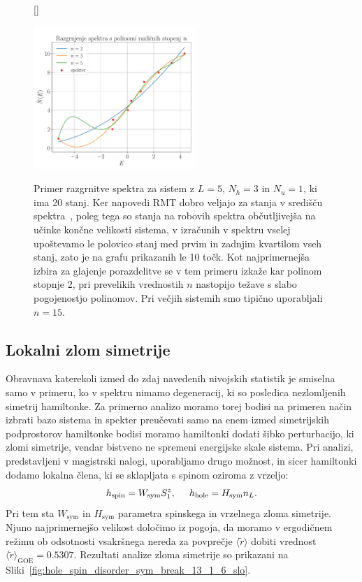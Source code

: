 \begin{figure}[H]
[\FBwidth]
{\caption{Primer razgrnitve spektra za sistem z $L=5$, $N_h=3$ in $N_u=1$, ki ima 20 stanj. Ker napovedi RMT dobro veljajo za stanja v središču spektra~\cite{d2016quantum}, poleg tega so stanja na robovih spektra občutljivejša na učinke končne velikosti sistema, v izračunih v spektru vselej upoštevamo le polovico stanj med prvim in zadnjim kvartilom vseh stanj, zato je na grafu prikazanih le 10 točk. Kot najprimernejša izbira za glajenje porazdelitve se v tem primeru izkaže kar polinom stopnje 2, pri prevelikih vrednostih $n$ nastopijo težave s slabo pogojenostjo polinomov. Pri večjih sistemih smo tipično uporabljali $n=15.$ }\label{fig:unfolding_schematics}}
{\includegraphics[width=0.55\textwidth]{unfolding_schematics.pdf}}
\end{figure}\newpage
\subsection{Lokalni zlom simetrije}
\label{lokalni_zlom_simetrije}
Obravnava katerekoli izmed do zdaj navedenih nivojskih statistik je smiselna samo v primeru, ko v spektru nimamo degeneracij, ki so posledica nezlomljenih simetrij hamiltonke. Za primerno analizo moramo torej bodisi na primeren način izbrati bazo sistema in spekter preučevati samo na enem izmed simetrijskih podprostorov hamiltonke bodisi moramo hamiltonki dodati šibko perturbacijo, ki zlomi simetrije, vendar bistveno ne spremeni energijske skale sistema. Pri analizi, predstavljeni v magistrski nalogi, uporabljamo drugo možnost, in sicer hamiltonki dodamo lokalna člena, ki se sklapljata s spinom oziroma z vrzeljo:
\begin{equation}\label{eq:sym_break_terms}
h_\mathrm{spin}=W_\mathrm{sym}S_1^z, \hspace{5mm} h_\mathrm{hole}=H_\mathrm{sym}n_L.
\end{equation}
Pri tem sta $W_\mathrm{sym}$ in $H_\mathrm{sym}$ parametra spinskega in vrzelnega zloma simetrije. Njuno najprimernejšo velikost določimo iz pogoja, da moramo v ergodičnem režimu ob odsotnosti vsakršnega nereda za povprečje $\langle\tilde{r} \rangle$ dobiti vrednost $\langle\tilde{r}\rangle_\mathrm{GOE}=0.5307$. Rezultati analize zloma simetrije so prikazani na Sliki~\ref{fig:hole_spin_disorder_sym_break_13_1_6_slo}.

